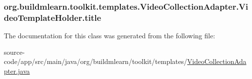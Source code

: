\subsubsection[{\texorpdfstring{title}{title}}]{ org.\+buildmlearn.\+toolkit.\+templates.\+Video\+Collection\+Adapter.\+Video\+Template\+Holder.\+title}\hypertarget{classorg_1_1buildmlearn_1_1toolkit_1_1templates_1_1VideoCollectionAdapter_1_1VideoTemplateHolder_a611477f821f47ee5dc30e233b8486435}{}\label{classorg_1_1buildmlearn_1_1toolkit_1_1templates_1_1VideoCollectionAdapter_1_1VideoTemplateHolder_a611477f821f47ee5dc30e233b8486435}


The documentation for this class was generated from the following file\+:\begin{DoxyCompactItemize}
\item 
source-\/code/app/src/main/java/org/buildmlearn/toolkit/templates/\hyperlink{VideoCollectionAdapter_8java}{Video\+Collection\+Adapter.\+java}\end{DoxyCompactItemize}
